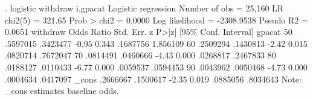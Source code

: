 . logistic withdraw i.gpacat
{\smallskip}
Logistic regression                             Number of obs     =     25,160
                                                LR chi2(5)        =     321.65
                                                Prob > chi2       =     0.0000
Log likelihood = -2308.9538                     Pseudo R2         =     0.0651
{\smallskip}
    withdraw {\VBAR} Odds Ratio   Std. Err.      z    P>|z|     [95\% Conf. Interval]
      gpacat {\VBAR}
         50  {\VBAR}   .5597015   .3423477    -0.95   0.343     .1687756    1.856109
         60  {\VBAR}   .2509294   .1430813    -2.42   0.015     .0820714    .7672047
         70  {\VBAR}   .0814491   .0460666    -4.43   0.000     .0268817    .2467833
         80  {\VBAR}   .0188127   .0110433    -6.77   0.000     .0059537    .0594453
         90  {\VBAR}   .0043962   .0050468    -4.73   0.000     .0004634    .0417097
             {\VBAR}
       _cons {\VBAR}   .2666667   .1500617    -2.35   0.019     .0885056    .8034643
Note: _cons estimates baseline odds.
{\smallskip}
